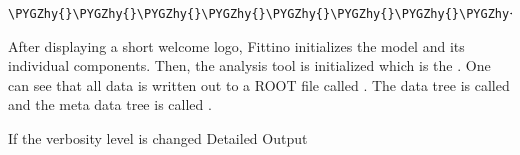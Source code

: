 \documentclass[letterpaper,10pt,english]{sphinxmanual}
\def\PYGZhy{\char`\-}
\begin{document}
\begin{Verbatim}[commandchars=\\\{\}]
\PYGZhy{}\PYGZhy{}\PYGZhy{}\PYGZhy{}\PYGZhy{}\PYGZhy{}\PYGZhy{}\PYGZhy{}\PYGZhy{}\PYGZhy{}\PYGZhy{}\PYGZhy{}\PYGZhy{}\PYGZhy{}\PYGZhy{}\PYGZhy{}\PYGZhy{}\PYGZhy{}\PYGZhy{}\PYGZhy{}\PYGZhy{}\PYGZhy{}\PYGZhy{}\PYGZhy{}\PYGZhy{}\PYGZhy{}\PYGZhy{}\PYGZhy{}\PYGZhy{}\PYGZhy{}\PYGZhy{}\PYGZhy{}\PYGZhy{}\PYGZhy{}\PYGZhy{}\PYGZhy{}\PYGZhy{}\PYGZhy{}\PYGZhy{}\PYGZhy{}\PYGZhy{}\PYGZhy{}\PYGZhy{}\PYGZhy{}\PYGZhy{}\PYGZhy{}\PYGZhy{}\PYGZhy{}\PYGZhy{}\PYGZhy{}\PYGZhy{}\PYGZhy{}\PYGZhy{}\PYGZhy{}\PYGZhy{}\PYGZhy{}\PYGZhy{}\PYGZhy{}\PYGZhy{}\PYGZhy{}\PYGZhy{}\PYGZhy{}\PYGZhy{}\PYGZhy{}\PYGZhy{}\PYGZhy{}\PYGZhy{}\PYGZhy{}\PYGZhy{}\PYGZhy{}\PYGZhy{}\PYGZhy{}\PYGZhy{}\PYGZhy{}\PYGZhy{}\PYGZhy{}\PYGZhy{}\PYGZhy{}\PYGZhy{}\PYGZhy{}\PYGZhy{}\PYGZhy{}\PYGZhy{}\PYGZhy{}\PYGZhy{}\PYGZhy{}\PYGZhy{}
\end{Verbatim}

After displaying a short welcome logo, Fittino initializes the model and its individual components.
Then, the analysis tool is initialized which is the . One can see that all data is
written out to a ROOT file called . The data tree is called  and the
meta data tree is called .

If the verbosity level is changed Detailed Output
\end{document}
